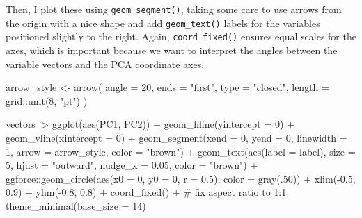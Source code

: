 \documentclass[
  letterpaper,
  10pt,
  krantz2]{krantz}
\makeatletter
\newenvironment{Shaded}{\begin{snugshade}}{\end{snugshade}}
\newcommand{\AttributeTok}[1]{\textcolor[rgb]{0.40,0.45,0.13}{#1}}
\newcommand{\CommentTok}[1]{\textcolor[rgb]{0.37,0.37,0.37}{#1}}
\newcommand{\DecValTok}[1]{\textcolor[rgb]{0.68,0.00,0.00}{#1}}
\newcommand{\FloatTok}[1]{\textcolor[rgb]{0.68,0.00,0.00}{#1}}
\newcommand{\FunctionTok}[1]{\textcolor[rgb]{0.28,0.35,0.67}{#1}}
\newcommand{\NormalTok}[1]{\textcolor[rgb]{0.00,0.23,0.31}{#1}}
\newcommand{\OtherTok}[1]{\textcolor[rgb]{0.00,0.23,0.31}{#1}}
\newcommand{\SpecialCharTok}[1]{\textcolor[rgb]{0.37,0.37,0.37}{#1}}
\newcommand{\StringTok}[1]{\textcolor[rgb]{0.13,0.47,0.30}{#1}}
\newenvironment{kframe}{%
  \medskip{}
  \setlength{\fboxsep}{.8em}
  \def\at@end@of@kframe{}%
  \ifinner\ifhmode%
  \def\at@end@of@kframe{\end{minipage}}%
  \begin{minipage}{\columnwidth}%
  \fi\fi%
  \def\FrameCommand##1{\hskip\@totalleftmargin \hskip-\fboxsep
  \colorbox{shadecolor}{##1}\hskip-\fboxsep
      \hskip-\linewidth \hskip-\@totalleftmargin \hskip\columnwidth}%
  \MakeFramed {\advance\hsize-\width
    \@totalleftmargin\z@ \linewidth\hsize
    \@setminipage}}%
{\par\unskip\endMakeFramed%
  \at@end@of@kframe}
\renewenvironment{Shaded}{\begin{kframe}}{\end{kframe}}
\makeatother
\begin{document}
Then, I plot these using \texttt{geom\_segment()}, taking some care to
use arrows from the origin with a nice shape and add
\texttt{geom\_text()} labels for the variables positioned slightly to
the right. Again, \texttt{coord\_fixed()} ensures equal scales for the
axes, which is important because we want to interpret the angles between
the variable vectors and the PCA coordinate axes.

\begin{Shaded}
\begin{Highlighting}[]
\NormalTok{arrow\_style }\OtherTok{\textless{}{-}} \FunctionTok{arrow}\NormalTok{(}
  \AttributeTok{angle =} \DecValTok{20}\NormalTok{, }\AttributeTok{ends =} \StringTok{"first"}\NormalTok{, }\AttributeTok{type =} \StringTok{"closed"}\NormalTok{, }
  \AttributeTok{length =}\NormalTok{ grid}\SpecialCharTok{::}\FunctionTok{unit}\NormalTok{(}\DecValTok{8}\NormalTok{, }\StringTok{"pt"}\NormalTok{)}
\NormalTok{)}

\NormalTok{vectors }\SpecialCharTok{|\textgreater{}}
  \FunctionTok{ggplot}\NormalTok{(}\FunctionTok{aes}\NormalTok{(PC1, PC2)) }\SpecialCharTok{+}
  \FunctionTok{geom\_hline}\NormalTok{(}\AttributeTok{yintercept =} \DecValTok{0}\NormalTok{) }\SpecialCharTok{+}
  \FunctionTok{geom\_vline}\NormalTok{(}\AttributeTok{xintercept =} \DecValTok{0}\NormalTok{) }\SpecialCharTok{+}
  \FunctionTok{geom\_segment}\NormalTok{(}\AttributeTok{xend =} \DecValTok{0}\NormalTok{, }\AttributeTok{yend =} \DecValTok{0}\NormalTok{, }
               \AttributeTok{linewidth =} \DecValTok{1}\NormalTok{, }
               \AttributeTok{arrow =}\NormalTok{ arrow\_style,}
               \AttributeTok{color =} \StringTok{"brown"}\NormalTok{) }\SpecialCharTok{+}
  \FunctionTok{geom\_text}\NormalTok{(}\FunctionTok{aes}\NormalTok{(}\AttributeTok{label =}\NormalTok{ label), }
            \AttributeTok{size =} \DecValTok{5}\NormalTok{,}
            \AttributeTok{hjust =} \StringTok{"outward"}\NormalTok{,}
            \AttributeTok{nudge\_x =} \FloatTok{0.05}\NormalTok{, }
            \AttributeTok{color =} \StringTok{"brown"}\NormalTok{) }\SpecialCharTok{+}
\NormalTok{  ggforce}\SpecialCharTok{::}\FunctionTok{geom\_circle}\NormalTok{(}\FunctionTok{aes}\NormalTok{(}\AttributeTok{x0 =} \DecValTok{0}\NormalTok{, }\AttributeTok{y0 =} \DecValTok{0}\NormalTok{, }\AttributeTok{r =} \FloatTok{0.5}\NormalTok{),  }\AttributeTok{color =} \FunctionTok{gray}\NormalTok{(.}\DecValTok{50}\NormalTok{)) }\SpecialCharTok{+}
  \FunctionTok{xlim}\NormalTok{(}\SpecialCharTok{{-}}\FloatTok{0.5}\NormalTok{, }\FloatTok{0.9}\NormalTok{) }\SpecialCharTok{+} 
  \FunctionTok{ylim}\NormalTok{(}\SpecialCharTok{{-}}\FloatTok{0.8}\NormalTok{, }\FloatTok{0.8}\NormalTok{) }\SpecialCharTok{+}
  \FunctionTok{coord\_fixed}\NormalTok{() }\SpecialCharTok{+}         \CommentTok{\# fix aspect ratio to 1:1}
  \FunctionTok{theme\_minimal}\NormalTok{(}\AttributeTok{base\_size =} \DecValTok{14}\NormalTok{)}
\end{Highlighting}
\end{Shaded}
\end{document}
